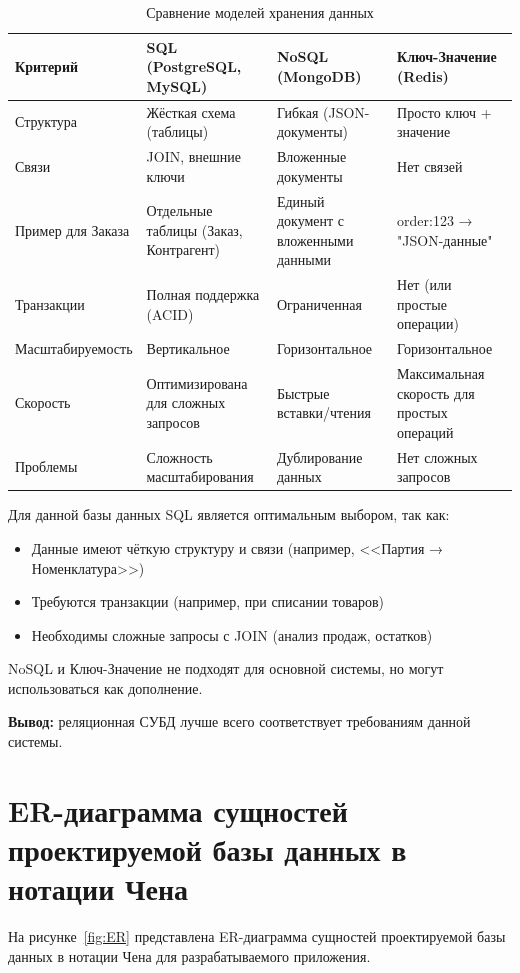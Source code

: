 \begin{table}[h]
	\centering
	\caption{Сравнение моделей хранения данных}
	\label{tab:db_comparison_BD}
	\begin{tabular}{|p{4cm}|p{3.5cm}|p{3.5cm}|p{3.5cm}|}
		\hline
		\textbf{Критерий} & \textbf{SQL (PostgreSQL, MySQL)} & \textbf{NoSQL (MongoDB)} & \textbf{Ключ-Значение (Redis)} \\
		\hline
		Структура & Жёсткая схема (таблицы) & Гибкая (JSON-документы) & Просто ключ + значение \\
		\hline
		Связи & JOIN, внешние ключи & Вложенные документы & Нет связей \\
		\hline
		Пример для Заказа & Отдельные таблицы (Заказ, Контрагент) & Единый документ с вложенными данными & order:123 → "JSON-данные" \\
		\hline
		Транзакции & Полная поддержка (ACID) & Ограниченная & Нет (или простые операции) \\
		\hline
		Масштабируемость & Вертикальное & Горизонтальное & Горизонтальное \\
		\hline
		Скорость & Оптимизирована для сложных запросов & Быстрые вставки/чтения & Максимальная скорость для простых операций \\
		\hline
		Проблемы & Сложность масштабирования & Дублирование данных & Нет сложных запросов \\
		\hline
	\end{tabular}
\end{table}

Для данной базы данных SQL является оптимальным выбором, так как:
\begin{itemize}
	\item Данные имеют чёткую структуру и связи (например, <<Партия → Номенклатура>>)
	\item Требуются транзакции (например, при списании товаров)
	\item Необходимы сложные запросы с JOIN (анализ продаж, остатков)
\end{itemize}

NoSQL и Ключ-Значение не подходят для основной системы, но могут использоваться как дополнение.

\textbf{Вывод:} реляционная СУБД лучше всего соответствует требованиям данной системы.

\section{ER-диаграмма сущностей проектируемой базы данных в нотации Чена}
На рисунке~\ref{fig:ER} представлена ER-диаграмма сущностей проектируемой базы данных в нотации Чена для разрабатываемого приложения.

